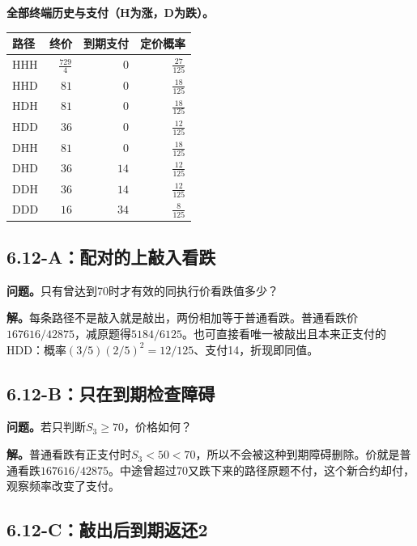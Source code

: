 \documentclass[11pt,a4paper,UTF8,fontset=fandol]{ctexart}
\begin{document}
\textbf{全部终端历史与支付（H为涨，D为跌）。}

\begin{longtable}[]{@{}lrrr@{}}
\toprule\noalign{}
路径 & 终价 & 到期支付 & 定价概率 \\
\midrule\noalign{}
\endhead
\bottomrule\noalign{}
\endlastfoot
HHH & \(\frac{729}{4}\) & \(0\) & \(\frac{27}{125}\) \\
HHD & \(81\) & \(0\) & \(\frac{18}{125}\) \\
HDH & \(81\) & \(0\) & \(\frac{18}{125}\) \\
HDD & \(36\) & \(0\) & \(\frac{12}{125}\) \\
DHH & \(81\) & \(0\) & \(\frac{18}{125}\) \\
DHD & \(36\) & \(14\) & \(\frac{12}{125}\) \\
DDH & \(36\) & \(14\) & \(\frac{12}{125}\) \\
DDD & \(16\) & \(34\) & \(\frac{8}{125}\) \\
\end{longtable}

\endgroup

\subsection{6.12-A：配对的上敲入看跌}\label{aux914dux5bf9ux7684ux4e0aux6572ux5165ux770bux8dcc}

\textbf{问题。}只有曾达到70时才有效的同执行价看跌值多少？

\textbf{解。}每条路径不是敲入就是敲出，两份相加等于普通看跌。普通看跌价\(167616/42875\)，减原题得\(\boxed{5184/6125}\)。也可直接看唯一被敲出且本来正支付的HDD：概率\((3/5)(2/5)^2=12/125\)、支付14，折现即同值。

\subsection{6.12-B：只在到期检查障碍}\label{bux53eaux5728ux5230ux671fux68c0ux67e5ux969cux788d}

\textbf{问题。}若只判断\(S_3\ge70\)，价格如何？

\textbf{解。}普通看跌有正支付时\(S_3<50<70\)，所以不会被这种到期障碍删除。价就是普通看跌\(\boxed{167616/42875}\)。中途曾超过70又跌下来的路径原题不付，这个新合约却付，观察频率改变了支付。

\subsection{6.12-C：敲出后到期返还2}\label{cux6572ux51faux540eux5230ux671fux8fd4ux8fd82}
\end{document}
